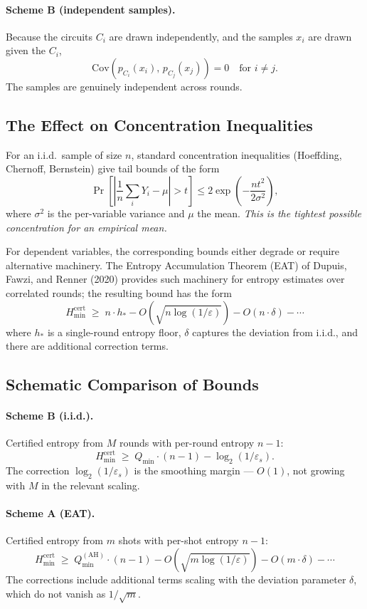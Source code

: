 \documentclass[11pt]{article}
\theoremstyle{plain}
\theoremstyle{definition}
\newcommand{\Cov}{\mathrm{Cov}}
\newcommand{\eps}{\varepsilon}
\begin{document}
\paragraph{Scheme B (independent samples).}
Because the circuits $C_i$ are drawn independently, and the samples $x_i$ are drawn given the $C_i$,
\begin{equation}
\Cov(p_{C_i}(x_i),\, p_{C_j}(x_j)) = 0 \quad \text{for } i \neq j.
\label{eq:scheme-b-cov}
\end{equation}
The samples are genuinely independent across rounds.

\subsection{The Effect on Concentration Inequalities}

For an i.i.d.\ sample of size $n$, standard concentration inequalities (Hoeffding, Chernoff, Bernstein) give tail bounds of the form
\[
\Pr\!\left[\left|\frac{1}{n}\sum_i Y_i - \mu\right| > t\right] \leq 2 \exp\!\left(-\frac{n t^2}{2\sigma^2}\right),
\]
where $\sigma^2$ is the per-variable variance and $\mu$ the mean. \emph{This is the tightest possible concentration for an empirical mean.}

For dependent variables, the corresponding bounds either degrade or require alternative machinery. The Entropy Accumulation Theorem (EAT) of Dupuis, Fawzi, and Renner (2020) provides such machinery for entropy estimates over correlated rounds; the resulting bound has the form
\[
H_{\min}^{\text{cert}} \;\geq\; n \cdot h_{*} - O(\sqrt{n \log(1/\eps)}) - O(n \cdot \delta) - \cdots
\]
where $h_*$ is a single-round entropy floor, $\delta$ captures the deviation from i.i.d., and there are additional correction terms.

\subsection{Schematic Comparison of Bounds}

\paragraph{Scheme B (i.i.d.).} Certified entropy from $M$ rounds with per-round entropy $n-1$:
\[
H_{\min}^{\text{cert}} \;\geq\; Q_{\min} \cdot (n-1) - \log_2(1/\eps_s).
\]
The correction $\log_2(1/\eps_s)$ is the smoothing margin --- $O(1)$, not growing with $M$ in the relevant scaling.

\paragraph{Scheme A (EAT).} Certified entropy from $m$ shots with per-shot entropy $n-1$:
\[
H_{\min}^{\text{cert}} \;\geq\; Q_{\min}^{(\text{AH})} \cdot (n-1) - O(\sqrt{m \log(1/\eps)}) - O(m \cdot \delta) - \cdots
\]
The corrections include additional terms scaling with the deviation parameter $\delta$, which do not vanish as $1/\sqrt{m}$.
\end{document}
